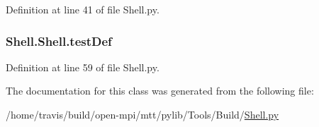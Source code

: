 Definition at line 41 of file Shell.\-py.

\hypertarget{class_shell_1_1_shell_ac2533422279cd3b3d3bc43e8b3de1301}{
\subsubsection[{test\-Def}]{\setlength{\rightskip}{0pt plus 5cm}Shell.\-Shell.\-test\-Def}}\label{class_shell_1_1_shell_ac2533422279cd3b3d3bc43e8b3de1301}


Definition at line 59 of file Shell.\-py.



The documentation for this class was generated from the following file\-:\begin{DoxyCompactItemize}
\item 
/home/travis/build/open-\/mpi/mtt/pylib/\-Tools/\-Build/\hyperlink{_shell_8py}{Shell.\-py}\end{DoxyCompactItemize}
